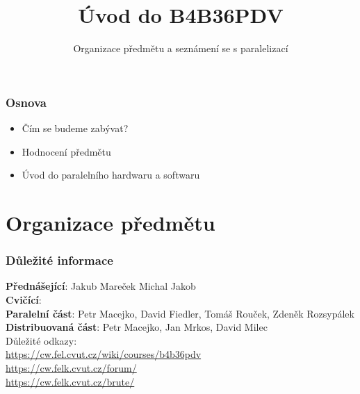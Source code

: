\documentclass[usenames,dvipsnames,9pt]{beamer}
\title{Úvod do B4B36PDV}
\subtitle{Organizace předmětu a seznámení se s paralelizací}
\date{}
\institute{B4B36PDV -- Paralelní a distribuované výpočty}
\begin{document}
\maketitle

\begin{frame}
  \frametitle{Osnova}
  \begin{itemize}
    \item Čím se budeme zabývat?
    \item Hodnocení předmětu\\[1.5em]
    \item Úvod do paralelního hardwaru a softwaru
  \end{itemize}
\end{frame}

\section{Organizace předmětu}

\begin{frame}
  \frametitle{Důležité informace}
  \small
  \textbf{Přednášející}: \hspace{5pt} Jakub Mareček \hspace{10pt} Michal Jakob \\[1em]
  \textbf{Cvičící}: \\
  \hspace*{10pt} \textbf{Paralelní část}: Petr Macejko, David Fiedler, Tomáš Rouček, Zdeněk Rozsypálek \\
  \hspace*{10pt} \textbf{Distribuovaná část}: Petr Macejko, Jan Mrkos, David Milec \\[3.5em]
  Důležité odkazy: \\[0.7em]
  {\Large\url{https://cw.fel.cvut.cz/wiki/courses/b4b36pdv}} \\[0.7em]
  \url{https://cw.felk.cvut.cz/forum/} \\
  \url{https://cw.felk.cvut.cz/brute/}
\end{frame}
\end{document}
